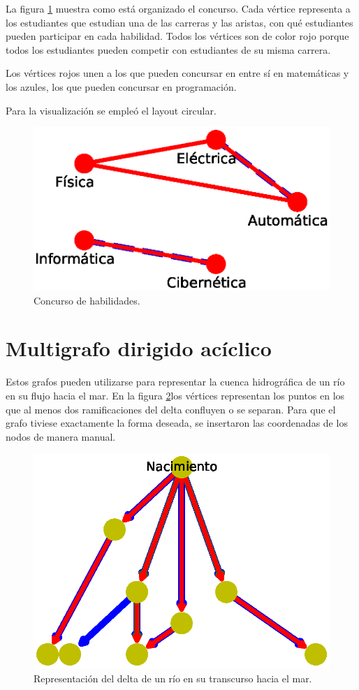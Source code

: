 \documentclass{article}
\begin{document}
La figura \ref{Figura 9} muestra como está organizado el concurso. Cada vértice representa a los estudiantes que estudian una de las carreras y las aristas, con qué estudiantes pueden participar en cada habilidad. Todos los vértices son de color rojo porque todos los estudiantes pueden competir con estudiantes de su misma carrera.

Los vértices rojos unen a los que pueden concursar en entre sí en matemáticas y los azules, los que pueden concursar en programación.

Para la visualización se empleó el layout circular.

\begin{figure}
  \includegraphics[width=.8\columnwidth]{fig9.eps}
  \caption{Concurso de habilidades.}
  \label{Figura 9}
\end{figure}




\section{Multigrafo dirigido acíclico}

Estos grafos pueden utilizarse para representar la cuenca hidrográfica de un río en su flujo hacia el mar. En la figura \ref{Figura 10}los vértices representan los puntos en los que al menos dos ramificaciones del delta confluyen o se separan. Para que el grafo tiviese exactamente la forma deseada, se insertaron las coordenadas de los nodos de manera manual.

\begin{figure}
  \includegraphics[width=.8\columnwidth]{fig10.eps}
  \caption{Representación del delta de un río en su transcurso hacia el mar.}
  \label{Figura 10}
\end{figure}
\end{document}
